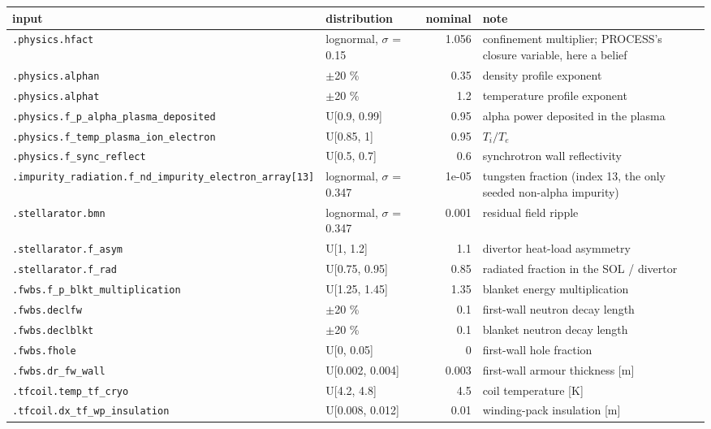 \begin{tabular}{llrl}
\toprule
input & distribution & nominal & note \\
\midrule
\texttt{.physics.hfact} & lognormal, $\sigma$ = 0.15 & 1.056 & confinement multiplier; PROCESS's closure variable, here a belief \\
\texttt{.physics.alphan} & $\pm$20 \% & 0.35 & density profile exponent \\
\texttt{.physics.alphat} & $\pm$20 \% & 1.2 & temperature profile exponent \\
\texttt{.physics.f\_p\_alpha\_plasma\_deposited} & U[0.9, 0.99] & 0.95 & alpha power deposited in the plasma \\
\texttt{.physics.f\_temp\_plasma\_ion\_electron} & U[0.85, 1] & 0.95 & $T_i / T_e$ \\
\texttt{.physics.f\_sync\_reflect} & U[0.5, 0.7] & 0.6 & synchrotron wall reflectivity \\
\texttt{.impurity\_radiation.f\_nd\_impurity\_electron\_array[13]} & lognormal, $\sigma$ = 0.347 & 1e-05 & tungsten fraction (index 13, the only seeded non-alpha impurity) \\
\texttt{.stellarator.bmn} & lognormal, $\sigma$ = 0.347 & 0.001 & residual field ripple \\
\texttt{.stellarator.f\_asym} & U[1, 1.2] & 1.1 & divertor heat-load asymmetry \\
\texttt{.stellarator.f\_rad} & U[0.75, 0.95] & 0.85 & radiated fraction in the SOL / divertor \\
\texttt{.fwbs.f\_p\_blkt\_multiplication} & U[1.25, 1.45] & 1.35 & blanket energy multiplication \\
\texttt{.fwbs.declfw} & $\pm$20 \% & 0.1 & first-wall neutron decay length \\
\texttt{.fwbs.declblkt} & $\pm$20 \% & 0.1 & blanket neutron decay length \\
\texttt{.fwbs.fhole} & U[0, 0.05] & 0 & first-wall hole fraction \\
\texttt{.fwbs.dr\_fw\_wall} & U[0.002, 0.004] & 0.003 & first-wall armour thickness [m] \\
\texttt{.tfcoil.temp\_tf\_cryo} & U[4.2, 4.8] & 4.5 & coil temperature [K] \\
\texttt{.tfcoil.dx\_tf\_wp\_insulation} & U[0.008, 0.012] & 0.01 & winding-pack insulation [m] \\

\end{tabular}
